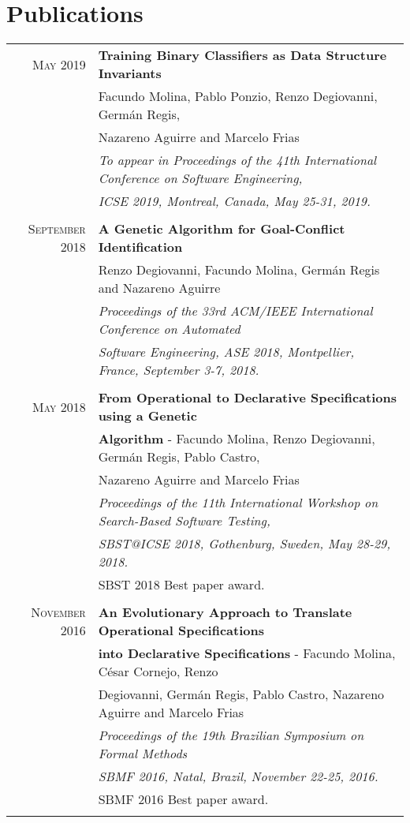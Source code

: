 \documentclass[a4paper,10pt]{article} %
\begin{document}
\section{Publications}
\begin{longtable}{rl}

\textsc{May} 2019  & \textbf{Training Binary Classifiers as Data Structure Invariants} \\ 
& Facundo Molina, Pablo Ponzio, Renzo Degiovanni, Germán Regis, \\ 
& Nazareno Aguirre and Marcelo Frias \\
& \textit{To appear in Proceedings of the 41th International Conference on Software Engineering,} \\
& \textit{ICSE 2019, Montreal, Canada, May 25-31, 2019.} \\ & \\

\textsc{September} 2018  & \textbf{A Genetic Algorithm for Goal-Conflict Identification} \\ 
& Renzo Degiovanni, Facundo Molina, Germán Regis and Nazareno Aguirre \\
& \textit{Proceedings of the 33rd ACM/IEEE International Conference on Automated } \\
& \textit{Software Engineering, ASE 2018, Montpellier, France, September 3-7, 2018.} \\ & \\

\textsc{May} 2018  & \textbf{From Operational to Declarative Specifications using a Genetic} \\ & \textbf{Algorithm} - Facundo Molina, Renzo Degiovanni, Germán Regis, Pablo Castro,\\
& Nazareno Aguirre and Marcelo Frias \\
& \textit{Proceedings of the 11th International Workshop on Search-Based Software Testing,} \\
& \textit{SBST@ICSE 2018, Gothenburg, Sweden, May 28-29, 2018.} \\
& SBST 2018 Best paper award. \\ & \\

\textsc{November} 2016 & \textbf{An Evolutionary Approach to Translate Operational Specifications} \\ & \textbf{into Declarative Specifications} - Facundo Molina, César Cornejo, Renzo \\
& Degiovanni, Germán Regis, Pablo Castro, Nazareno Aguirre and Marcelo Frias \\
& \textit{Proceedings of the 19th Brazilian Symposium on Formal Methods} \\ 
& \textit{SBMF 2016, Natal, Brazil, November 22-25, 2016.} \\ 
& SBMF 2016 Best paper award. \\ & \\

\end{longtable}
\end{document}
